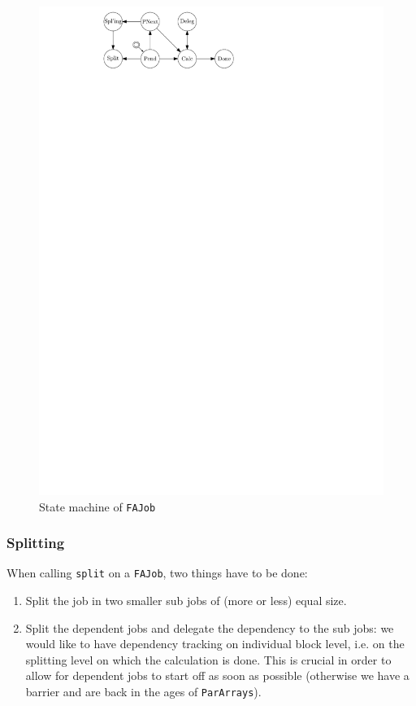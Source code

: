 \documentclass[runningheads,a4paper,fleqn]{llncs}
\begin{document}
\begin{figure}
  \centering
  \includegraphics{fajob-state}
  \caption{State machine of \texttt{FAJob}}
  \label{fig:fajob-state}
\end{figure}

\subsubsection{Splitting}
When calling \texttt{split} on a \texttt{FAJob}, two things have to be
done:
\begin{enumerate}
\item Split the job in two smaller sub jobs of (more or less) equal
  size.
\item Split the dependent jobs and delegate the dependency to the
  sub jobs: we would like to have dependency tracking on individual
  block level, i.e. on the splitting level on which the calculation is 
  done. This is crucial in order to allow for dependent jobs to start
  off as soon as possible (otherwise we have a barrier and are back in
  the ages of \texttt{ParArrays}).
\end{enumerate}
\end{document}
